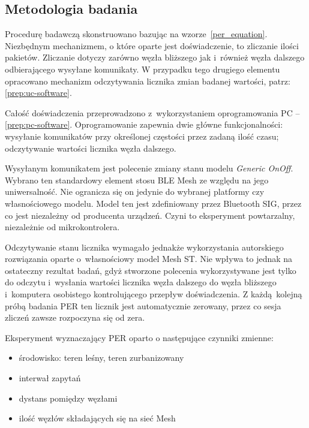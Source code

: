 \subsection{Metodologia badania} \label{subsubsec:test-procedure}

Procedurę badawczą skonstruowano bazując na wzorze~\ref{per_equation}. Niezbędnym mechanizmem, o które oparte
jest doświadczenie, to zliczanie ilości pakietów. Zliczanie dotyczy zarówno węzła bliższego 
jak i~również węzła dalszego odbierającego wysyłane komunikaty. W przypadku tego drugiego elementu 
opracowano mechanizm odczytywania licznika zmian badanej wartości, patrz: \ref{prep:uc-software}.

Całość doświadczenia przeprowadzono z~wykorzystaniem oprogramowania PC -- \ref{prep:pc-software}. Oprogramowanie
zapewnia dwie główne funkcjonalności: wysyłanie komunikatów przy określonej częstości przez zadaną ilość czasu;
odczytywanie wartości licznika węzła dalszego.

Wysyłanym komunikatem jest polecenie zmiany stanu modelu
\textit{Generic OnOff}. Wybrano ten standardowy element stosu BLE Mesh ze względu na jego uniwersalność.
Nie ogranicza się on jedynie do wybranej platformy czy własnościowego modelu. Model ten jest zdefiniowany
przez Bluetooth SIG, przez co jest niezależny od producenta urządzeń. Czyni to eksperyment powtarzalny,
niezależnie od mikrokontrolera.

Odczytywanie stanu licznika wymagało jednakże wykorzystania autorskiego rozwiązania oparte o~własnościowy model Mesh
ST. Nie wpływa to jednak na ostateczny rezultat badań, gdyż stworzone polecenia wykorzystywane jest
tylko do odczytu i~wysłania wartości licznika węzła dalszego do węzła bliższego i~komputera osobistego kontrolującego
przepływ doświadczenia. Z każdą kolejną próbą badania PER ten licznik jest automatycznie zerowany,
przez co sesja zliczeń zawsze rozpoczyna się od zera.

Eksperyment wyznaczający PER oparto o następujące czynniki zmienne:
\begin{itemize}
\item środowisko: teren leśny, teren zurbanizowany
\item interwał zapytań
\item dystans pomiędzy węzłami
\item ilość węzłów składających się na sieć Mesh
\end{itemize}



